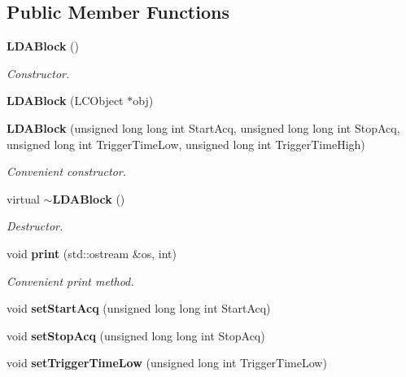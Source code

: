 \subsection*{Public Member Functions}
\begin{DoxyCompactItemize}
\item 
{\bf L\-D\-A\-Block} ()\label{classCALICE_1_1LDABlock_a9ebbc6dc0b81b6e1a262a0eacbddba6f}

\begin{DoxyCompactList}\small\item\em Constructor. \end{DoxyCompactList}\item 
{\bfseries L\-D\-A\-Block} (L\-C\-Object $\ast$obj)\label{classCALICE_1_1LDABlock_aa4951561a8f9621112ccef2cd9460b57}

\item 
{\bf L\-D\-A\-Block} (unsigned long long int Start\-Acq, unsigned long long int Stop\-Acq, unsigned long int Trigger\-Time\-Low, unsigned long int Trigger\-Time\-High)\label{classCALICE_1_1LDABlock_ad6d90f79de9f214f6992cd5c730ecb9c}

\begin{DoxyCompactList}\small\item\em Convenient constructor. \end{DoxyCompactList}\item 
virtual {\bf $\sim$\-L\-D\-A\-Block} ()\label{classCALICE_1_1LDABlock_af30bb970cb30721583ecdb540d191854}

\begin{DoxyCompactList}\small\item\em Destructor. \end{DoxyCompactList}\item 
void {\bf print} (std\-::ostream \&os, int)\label{classCALICE_1_1LDABlock_a18b09b2d2ce5e3ae3f78cd86756fb40e}

\begin{DoxyCompactList}\small\item\em Convenient print method. \end{DoxyCompactList}\item 
void {\bfseries set\-Start\-Acq} (unsigned long long int Start\-Acq)\label{classCALICE_1_1LDABlock_ae2ae1f21a4bccff7f7d1a7f39f485725}

\item 
void {\bfseries set\-Stop\-Acq} (unsigned long long int Stop\-Acq)\label{classCALICE_1_1LDABlock_a00fc7b0396672e6bf7fef63ae354f47d}

\item 
void {\bf set\-Trigger\-Time\-Low} (unsigned long int Trigger\-Time\-Low)\label{classCALICE_1_1LDABlock_ad0370f93ee3602a5251515f8f98e5382}


\end{DoxyCompactItemize}
